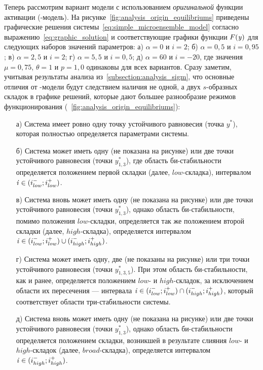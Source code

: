 Теперь рассмотрим вариант модели с использованием \textit{оригинальной} функции активации (-модель). На рисунке~\ref{fig:analysis_origin_equilibriums} приведены графические решения системы~\eqref{eq:simple_microensemble_model} согласно выражению~\eqref{eq:graphic_solution} и соответствующие графики функции $F(\mathit{y})$ для следующих наборов значений параметров: а) $\alpha = 0  $ и $i = 2$; б) $\alpha = 0,5$ и $i = 0,95$; в) $\alpha = 2,5$ и $i = 2$; г) $\alpha = 5,5$ и $i = 0,5$; д) $\alpha = 60$ и $i = -20$, где значения  $\mu = 0,75$, $\theta = 1$ и $p = 1,0$ одинаковы для всех вариантов. Сразу заметим, учитывая результаты анализа из~\autoref{subsection:analysis_sigm}, что основные отличия от -модели будут следствием наличия не одной, а двух $s$-образных складок в графике решений, которые дают большее разнообразие режимов функционирования (\seefigure~\ref{fig:analysis_origin_equilibriums}):
\begin{itemize}
    \item[а)] Система имеет ровно одну точку устойчивого равновесия (точка $y^{*}$), которая полностью определяется параметрами системы.
    \item[б)] Система может иметь одну (не показана на рисунке) или две точки устойчивого равновесия (точки $y^{*}_{1,3}$), где область би-стабильности определяется положением первой складки (далее, $low$-складка), \ie интервалом $\mathit{i} \in (i_{low}^{-}; i_{low}^{+})$.
    \item[в)] Система вновь может иметь одну (не показана на рисунке) или две точки устойчивого равновесия (точки $y^{*}_{1,3}$), однако область би-стабильности, помимо положения $low$-складки, определяется так же положением второй складки (далее, $high$-складка), \ie определяется интервалом $\mathit{i} \in (i_{low}^{-}; i_{low}^{+}) \cup (i_{high}^{-}; i_{high}^{+})$.
    \item[г)] Система может иметь одну, две (не показаны на рисунке) или три точки устойчивого равновесия (точки $y^{*}_{1,3,5}$). При этом область би-стабильности, как и ранее, определяется положением $low$- и $high$-складок, за исключением области их пересечения --- интервала $\mathit{i} \in (i_{low}^{-}; i_{low}^{+}) \cap (i_{high}^{-}; i_{high}^{+})$, который соответствует области три-стабильности системы.
    \item[д)] Система вновь может иметь одну (не показана на рисунке) или две точки устойчивого равновесия (точки $y^{*}_{1,3}$), однако область би-стабильности определяется положением складки, возникшей в результате слияния $low$- и $high$-складок (далее, $broad$-складка), \ie определяется интервалом $\mathit{i} \in (i_{high}^{-}; i_{high}^{+})$.
\end{itemize}

